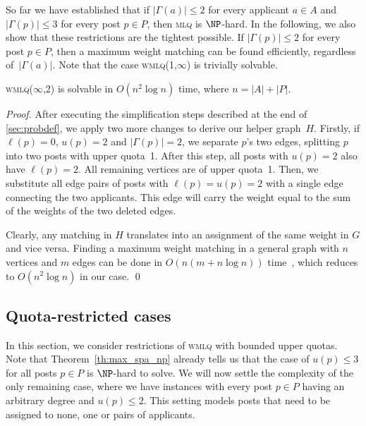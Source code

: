 \documentclass{llncs}
\begin{document}
So far we have established that if $|\Gamma(a)| \leq 2$ for every applicant $a \in A$ and $|\Gamma(p)| \leq 3$ for every post $p \in P$, then \textsc{mlq} is $\NP$-hard. In the following, we also show that these restrictions are the tightest possible. If $|\Gamma(p)| \leq 2$ for every post $p \in P$, then a maximum weight matching can be found efficiently, regardless of~$|\Gamma(a)|$. Note that the case \textsc{wmlq(1,$\infty$)} is trivially solvable.

\begin{theorem}
\label{th:infty_2}
	\textsc{wmlq($\infty$,2)} is solvable in $O(n^2 \log n)$ time, where $n = |A| + |P|$.
\end{theorem}

\begin{proof}
	After executing the simplification steps described at the end of \cref{sec:probdef}, we apply two more changes to derive our helper graph~$H$. Firstly, if $\ell(p) = 0$, $u(p) = 2$ and $|\Gamma(p)| = 2$, we separate $p$'s two edges, splitting $p$ into two posts with upper quota~1. After this step, all posts with $u(p) = 2$ also have $\ell(p) = 2$. All remaining vertices are of upper quota~1. Then, we substitute all edge pairs of posts with $\ell(p) = u(p) = 2$ with a single edge connecting the two applicants. This edge will carry the weight equal to the sum of the weights of the two deleted edges.
    
    Clearly, any matching in $H$ translates into an assignment of the same weight in $G$ and vice versa. Finding a maximum weight matching in a general graph with $n$ vertices and $m$ edges can be done in $O(n(m + n \log n))$ time~\cite{Gab90}, which reduces to $O(n^2 \log n)$ in our case. \qed
\end{proof}

\subsection{Quota-restricted cases}
\label{sec:quotarest}
In this section, we consider restrictions of \textsc{wmlq} with bounded upper quotas. Note that Theorem~\ref{th:max_spa_np} already tells us that the case of $u(p) \leq 3$ for all posts $p \in P$ is $\NP$-hard to solve. We will now settle the complexity of the only remaining case, where we have instances with every post $p\in P$ having an arbitrary degree and $u(p) \le 2$. This setting models posts that need to be assigned  to none, one or pairs of applicants.
\end{document}

